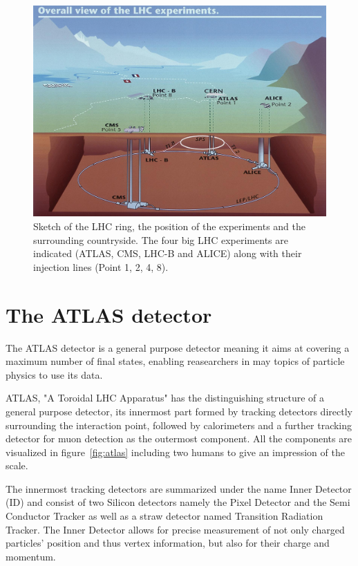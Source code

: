 \begin{figure}[htbp]
  \centering
  \includegraphics[scale=0.4]{figures_LHC/CERN-all-experiments.jpg}
  \caption[Sketch of the LHC ring.]{Sketch of the LHC ring, the position
    of the experiments and the surrounding countryside. The four big
    LHC experiments are indicated (ATLAS, CMS, LHC-B and ALICE) along with their injection lines (Point 1, 2, 4, 8).~\cite{Jean-Luc:841555}}
  \label{fig:LHC}
\end{figure}


\section{The ATLAS detector}

The ATLAS detector is a general purpose detector meaning it aims at covering a maximum number of final states, enabling reasearchers in may topics of particle physics to use its data.

ATLAS, "A Toroidal LHC Apparatus" has the distinguishing structure of a general purpose detector, its innermost part formed by tracking detectors directly surrounding the interaction point, followed by calorimeters and a further tracking detector for muon detection as the outermost component. All the components are visualized in figure~\ref{fig:atlas} including two humans to give an impression of the scale.

The innermost tracking detectors are summarized under the name Inner Detector (ID) and consist of two Silicon detectors namely the Pixel Detector and the Semi Conductor Tracker as well as a straw detector named Transition Radiation Tracker. The Inner Detector allows for precise measurement of not only charged particles' position and thus vertex information, but also for their charge and momentum.

